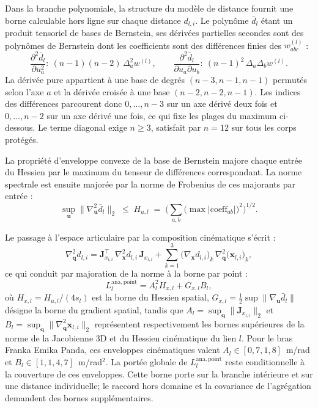 Dans la branche polynomiale, la structure du modèle de distance fournit une borne calculable hors ligne sur chaque distance $d_{l,i}$. Le polynôme $\bar{d}_l$ étant un produit tensoriel de bases de Bernstein, ses dérivées partielles secondes sont des polynômes de Bernstein dont les coefficients sont des différences finies des $w^{(l)}_{abc}$ :
\begin{equation}
\frac{\partial^2 \bar{d}_l}{\partial u_a^2}:\ (n-1)(n-2)\,\Delta^2_a w^{(l)},
\qquad
\frac{\partial^2 \bar{d}_l}{\partial u_a \partial u_b}:\ (n-1)^2\,\Delta_a\Delta_b w^{(l)}.
\end{equation}
La dérivée pure appartient à une base de degrés $(n-3,n-1,n-1)$ permutés selon l'axe $a$ et la dérivée croisée à une base $(n-2,n-2,n-1)$. Les indices des différences parcourent donc $0,\ldots,n-3$ sur un axe dérivé deux fois et $0,\ldots,n-2$ sur un axe dérivé une fois, ce qui fixe les plages du maximum ci-dessous. Le terme diagonal exige $n\geq3$, satisfait par $n=12$ sur tous les corps protégés.

La propriété d'enveloppe convexe de la base de Bernstein majore chaque entrée du Hessien par le maximum du tenseur de différences correspondant. La norme spectrale est ensuite majorée par la norme de Frobenius de ces majorants par entrée :
\begin{equation}
\sup_{\mathbf{u}}\big\|\nabla^2_{\mathbf{u}}\bar{d}_l\big\|_2 \;\leq\; H_{u,l} \;=\; \Big(\textstyle\sum_{a,b}\big(\max\big|\text{coeff}_{ab}\big|\big)^2\Big)^{1/2}.
\end{equation}

Le passage à l'espace articulaire par la composition cinématique s'écrit :
\begin{equation}
\nabla^2_{\mathbf{q}} d_{l,i}
= \mathbf{J}_{x_{l,i}}^{\top}\,\nabla^2_{\mathbf{x}} d_{l,i}\,\mathbf{J}_{x_{l,i}}
+ \sum_{k=1}^{3} \big(\nabla_{\mathbf{x}} d_{l,i}\big)_k\,\nabla^2_{\mathbf{q}}\big(\mathbf{x}_{l,i}\big)_k,
\end{equation}
ce qui conduit par majoration de la norme à la borne par point :
\begin{equation}
L_l^{\mathrm{ana,point}} = A_l^2 H_{x,l} + G_{x,l} B_l,
\end{equation}
où $H_{x,l}=H_{u,l}/(4s_l)$ est la borne du Hessien spatial, $G_{x,l}=\tfrac12\sup\|\nabla_{\mathbf u}\bar d_l\|$ désigne la borne du gradient spatial, tandis que $A_l = \sup_{\mathbf{q}} \|\mathbf{J}_{x_{l,i}}\|_2$ et $B_l = \sup_{\mathbf{q}} \|\nabla^2_{\mathbf{q}}\mathbf{x}_{l,i}\|_2$ représentent respectivement les bornes supérieures de la norme de la Jacobienne 3D et du Hessien cinématique du lien $l$. Pour le bras Franka Emika Panda, ces enveloppes cinématiques valent $A_l\in[0{,}7,1{,}8]$~m/rad et $B_l\in[1{,}1,4{,}7]$~m/rad$^2$. La portée globale de $L_l^{\mathrm{ana,point}}$ reste conditionnelle à la couverture de ces enveloppes. Cette borne porte sur la branche intérieure et sur une distance individuelle; le raccord hors domaine et la covariance de l'agrégation demandent des bornes supplémentaires.

